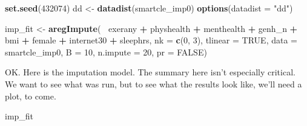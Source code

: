 \documentclass[]{book}
\newenvironment{Shaded}{\begin{snugshade}}{\end{snugshade}}
\newcommand{\KeywordTok}[1]{\textcolor[rgb]{0.13,0.29,0.53}{\textbf{#1}}}
\newcommand{\DataTypeTok}[1]{\textcolor[rgb]{0.13,0.29,0.53}{#1}}
\newcommand{\DecValTok}[1]{\textcolor[rgb]{0.00,0.00,0.81}{#1}}
\newcommand{\StringTok}[1]{\textcolor[rgb]{0.31,0.60,0.02}{#1}}
\newcommand{\OtherTok}[1]{\textcolor[rgb]{0.56,0.35,0.01}{#1}}
\newcommand{\OperatorTok}[1]{\textcolor[rgb]{0.81,0.36,0.00}{\textbf{#1}}}
\newcommand{\NormalTok}[1]{#1}
\theoremstyle{definition}
\theoremstyle{definition}
\theoremstyle{definition}
\theoremstyle{remark}
\begin{document}
\begin{Shaded}
\begin{Highlighting}[]
\KeywordTok{set.seed}\NormalTok{(}\DecValTok{432074}\NormalTok{)}
\NormalTok{dd <-}\StringTok{ }\KeywordTok{datadist}\NormalTok{(smartcle_imp0)}
\KeywordTok{options}\NormalTok{(}\DataTypeTok{datadist =} \StringTok{"dd"}\NormalTok{)}

\NormalTok{imp_fit <-}\StringTok{ }\KeywordTok{aregImpute}\NormalTok{(}\OperatorTok{~}\StringTok{ }\NormalTok{exerany }\OperatorTok{+}\StringTok{ }\NormalTok{physhealth }\OperatorTok{+}\StringTok{ }\NormalTok{menthealth }\OperatorTok{+}
\StringTok{                          }\NormalTok{genh_n }\OperatorTok{+}\StringTok{ }\NormalTok{bmi }\OperatorTok{+}\StringTok{ }\NormalTok{female }\OperatorTok{+}\StringTok{ }
\StringTok{                          }\NormalTok{internet30 }\OperatorTok{+}\StringTok{ }\NormalTok{sleephrs, }
                   \DataTypeTok{nk =} \KeywordTok{c}\NormalTok{(}\DecValTok{0}\NormalTok{, }\DecValTok{3}\NormalTok{), }\DataTypeTok{tlinear =} \OtherTok{TRUE}\NormalTok{,}
                   \DataTypeTok{data =}\NormalTok{ smartcle_imp0, }\DataTypeTok{B =} \DecValTok{10}\NormalTok{, }
                   \DataTypeTok{n.impute =} \DecValTok{20}\NormalTok{, }\DataTypeTok{pr =} \OtherTok{FALSE}\NormalTok{) }
\end{Highlighting}
\end{Shaded}

OK. Here is the imputation model. The summary here isn't especially
critical. We want to see what was run, but to see what the results look
like, we'll need a plot, to come.

\begin{Shaded}
\begin{Highlighting}[]
\NormalTok{imp_fit}
\end{Highlighting}
\end{Shaded}
\end{document}
